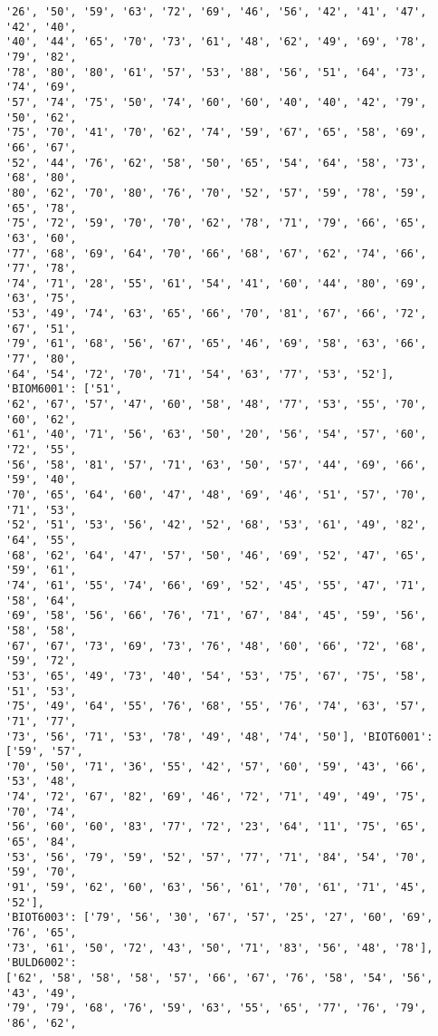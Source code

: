 \documentclass[11pt]{article}
\begin{document}
\begin{Verbatim}[commandchars=\\\{\}]
'26', '50', '59', '63', '72', '69', '46', '56', '42', '41', '47', '42', '40',
'40', '44', '65', '70', '73', '61', '48', '62', '49', '69', '78', '79', '82',
'78', '80', '80', '61', '57', '53', '88', '56', '51', '64', '73', '74', '69',
'57', '74', '75', '50', '74', '60', '60', '40', '40', '42', '79', '50', '62',
'75', '70', '41', '70', '62', '74', '59', '67', '65', '58', '69', '66', '67',
'52', '44', '76', '62', '58', '50', '65', '54', '64', '58', '73', '68', '80',
'80', '62', '70', '80', '76', '70', '52', '57', '59', '78', '59', '65', '78',
'75', '72', '59', '70', '70', '62', '78', '71', '79', '66', '65', '63', '60',
'77', '68', '69', '64', '70', '66', '68', '67', '62', '74', '66', '77', '78',
'74', '71', '28', '55', '61', '54', '41', '60', '44', '80', '69', '63', '75',
'53', '49', '74', '63', '65', '66', '70', '81', '67', '66', '72', '67', '51',
'79', '61', '68', '56', '67', '65', '46', '69', '58', '63', '66', '77', '80',
'64', '54', '72', '70', '71', '54', '63', '77', '53', '52'], 'BIOM6001': ['51',
'62', '67', '57', '47', '60', '58', '48', '77', '53', '55', '70', '60', '62',
'61', '40', '71', '56', '63', '50', '20', '56', '54', '57', '60', '72', '55',
'56', '58', '81', '57', '71', '63', '50', '57', '44', '69', '66', '59', '40',
'70', '65', '64', '60', '47', '48', '69', '46', '51', '57', '70', '71', '53',
'52', '51', '53', '56', '42', '52', '68', '53', '61', '49', '82', '64', '55',
'68', '62', '64', '47', '57', '50', '46', '69', '52', '47', '65', '59', '61',
'74', '61', '55', '74', '66', '69', '52', '45', '55', '47', '71', '58', '64',
'69', '58', '56', '66', '76', '71', '67', '84', '45', '59', '56', '58', '58',
'67', '67', '73', '69', '73', '76', '48', '60', '66', '72', '68', '59', '72',
'53', '65', '49', '73', '40', '54', '53', '75', '67', '75', '58', '51', '53',
'75', '49', '64', '55', '76', '68', '55', '76', '74', '63', '57', '71', '77',
'73', '56', '71', '53', '78', '49', '48', '74', '50'], 'BIOT6001': ['59', '57',
'70', '50', '71', '36', '55', '42', '57', '60', '59', '43', '66', '53', '48',
'74', '72', '67', '82', '69', '46', '72', '71', '49', '49', '75', '70', '74',
'56', '60', '60', '83', '77', '72', '23', '64', '11', '75', '65', '65', '84',
'53', '56', '79', '59', '52', '57', '77', '71', '84', '54', '70', '59', '70',
'91', '59', '62', '60', '63', '56', '61', '70', '61', '71', '45', '52'],
'BIOT6003': ['79', '56', '30', '67', '57', '25', '27', '60', '69', '76', '65',
'73', '61', '50', '72', '43', '50', '71', '83', '56', '48', '78'], 'BULD6002':
['62', '58', '58', '58', '57', '66', '67', '76', '58', '54', '56', '43', '49',
'79', '79', '68', '76', '59', '63', '55', '65', '77', '76', '79', '86', '62',

\end{Verbatim}
\end{document}
